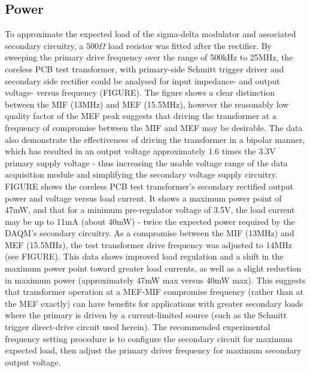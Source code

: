 \documentclass[conference]{IEEEtran}
\begin{document}
	\subsection{Power}
	To approximate the expected load of the sigma-delta modulator and associated secondary circuitry, a $500\Omega $ load resistor was fitted after the rectifier.  By sweeping the primary drive frequency over the range of 500kHz to 25MHz, the coreless PCB test transformer, with primary-side Schmitt trigger driver and secondary side rectifier could be analysed for input impedance- and output voltage- versus frequency (FIGURE).  The figure shows a clear distinction between the MIF (13MHz) and MEF (15.5MHz), however the reasonably low quality factor of the MEF peak suggests that driving the transformer at a frequency of compromise between the MIF and MEF may be desirable.  The data also demonstrate the effectiveness of driving the transformer in a bipolar manner, which has resulted in an output voltage approximately 1.6 times the 3.3V primary supply voltage - thus increasing the usable voltage range of the data acquisition module and simplifying the secondary voltage supply circuitry.
	FIGURE shows the coreless PCB test transformer's secondary rectified output power and voltage versus load current.  It shows a maximum power point of 47mW, and that for a minimum pre-regulator voltage of 3.5V, the load current may be up to 11mA (about 40mW) - twice the expected power required by the DAQM's secondary circuitry.  
	As a compromise between the MIF (13MHz) and MEF (15.5MHz), the test transformer drive frequency was adjusted to 14MHz (see FIGURE).  This data shows improved load regulation and a shift in the maximum power point toward greater load currents, as well as a slight reduction in maximum power (approximately 47mW max versus 40mW max).  This suggests that transformer operation at a MEF-MIF compromise frequency (rather than at the MEF exactly) can have benefits for applications with greater secondary loads where the primary is driven by a current-limited source (such as the Schmitt trigger direct-drive circuit used herein).  The recommended experimental frequency setting procedure is to configure the secondary circuit for maximum expected load, then adjust the primary driver frequency for maximum secondary output voltage.
\end{document}
